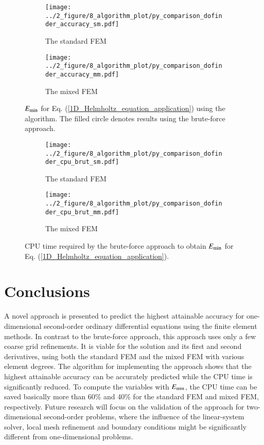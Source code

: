\documentclass[review,3p]{elsarticle}
\begin{document}
\begin{figure}[!ht]
	\centering
    \begin{subfigure}{6.0cm}
        \texttt{[image: ../2\_figure/8\_algorithm\_plot/py\_comparison\_dofinder\_accuracy\_sm.pdf]}
        \caption{The standard FEM}
        \label{E_min_application_sm}
    \end{subfigure}
    \hspace{0.0cm}
    \begin{subfigure}{6.0cm}	                		 	
        \texttt{[image: ../2\_figure/8\_algorithm\_plot/py\_comparison\_dofinder\_accuracy\_mm.pdf]}
        \caption{The mixed FEM}
        \label{E_min_application_mm}
    \end{subfigure}
\caption{$E_{\rm min}$ for Eq. (\ref{1D_Helmholtz_equation_application}) using the algorithm. The filled circle denotes results using the brute-force approach.}
\label{E_min_application}
\end{figure}

\begin{figure}[!ht]
	\centering
    \begin{subfigure}{6.0cm}
        \texttt{[image: ../2\_figure/8\_algorithm\_plot/py\_comparison\_dofinder\_cpu\_brut\_sm.pdf]}
        \caption{The standard FEM}
        \label{CPU_application_sm}
    \end{subfigure}
    \hspace{0.0cm}
    \begin{subfigure}{6.0cm}	                		 	
        \texttt{[image: ../2\_figure/8\_algorithm\_plot/py\_comparison\_dofinder\_cpu\_brut\_mm.pdf]}
        \caption{The mixed FEM}
        \label{CPU_application_mm}
    \end{subfigure}
\caption{CPU time required by the brute-force approach to obtain $E_{\rm min}$ for Eq. (\ref{1D_Helmholtz_equation_application}).}
\label{CPU_application}
\end{figure}


\section{Conclusions}		\label{paragraph on conclusion}

A novel approach is presented to predict the highest attainable accuracy for one-dimensional second-order ordinary differential equations using the finite element methods.
In contrast to the brute-force approach, this approach uses only a few coarse grid refinements. It is viable for the solution and its first and second derivatives, using both the standard FEM and the mixed FEM with various element degrees.
The algorithm for implementing the approach shows that the highest attainable accuracy can be accurately predicted while the CPU time is significantly reduced. To compute the variables with $E_{\rm min}$, the CPU time can be saved basically more than 60\% and 40\% for the standard FEM and mixed FEM, respectively.
Future research will focus on the validation of the approach for two-dimensional second-order problems, where the influence of the linear-system solver, local mesh refinement and boundary conditions might be significantly different from one-dimensional problems. 
\end{document}
